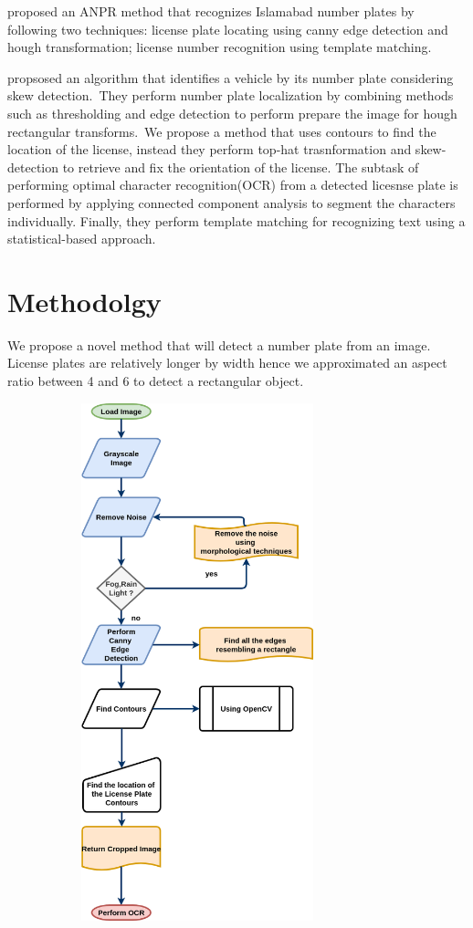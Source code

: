 \documentclass[a4paper,twoside,10pt]{report}
\begin{document}
\citet*{RasheedAutomatedNP} proposed an ANPR method that recognizes Islamabad number plates by following two techniques: license plate locating using canny edge detection and hough transformation;  license number recognition using template matching.

\citet*{6510317} propsosed an algorithm that identifies a vehicle by its number plate considering skew detection.\
They perform number plate localization by combining methods such as thresholding and edge detection to perform prepare the image for hough rectangular transforms.\ 
We propose a method that uses contours to find the location of the license, instead they perform top-hat trasnformation and skew-detection to retrieve and fix the orientation of the license. 
The subtask of performing optimal character recognition(OCR) from a detected licesnse plate is performed by applying connected component analysis to segment the characters individually. Finally, they perform template matching for recognizing text using a statistical-based approach.
\chapter{Methodolgy}
We propose a novel method that will detect a number plate from an image.
License plates are relatively longer by width hence we approximated an aspect ratio between 4 and 6 to detect a rectangular object.

\begin{center}
  \includegraphics[width=11cm,height=15cm]{images/Methodology.png}
\end{center}
\end{document}
